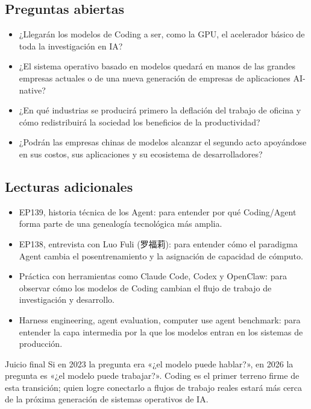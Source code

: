 \documentclass[a4paper]{article}
\begin{document}
\subsection{Preguntas abiertas}

\begin{itemize}
\item ¿Llegarán los modelos de Coding a ser, como la GPU, el acelerador básico de toda la investigación en IA?
\item ¿El sistema operativo basado en modelos quedará en manos de las grandes empresas actuales o de una nueva generación de empresas de aplicaciones AI-native?
\item ¿En qué industrias se producirá primero la deflación del trabajo de oficina y cómo redistribuirá la sociedad los beneficios de la productividad?
\item ¿Podrán las empresas chinas de modelos alcanzar el segundo acto apoyándose en sus costos, sus aplicaciones y su ecosistema de desarrolladores?
\end{itemize}

\subsection{Lecturas adicionales}

\begin{itemize}
\item EP139, historia técnica de los Agent: para entender por qué Coding/Agent forma parte de una genealogía tecnológica más amplia.
\item EP138, entrevista con Luo Fuli (罗福莉): para entender cómo el paradigma Agent cambia el posentrenamiento y la asignación de capacidad de cómputo.
\item Práctica con herramientas como Claude Code, Codex y OpenClaw: para observar cómo los modelos de Coding cambian el flujo de trabajo de investigación y desarrollo.
\item Harness engineering, agent evaluation, computer use agent benchmark: para entender la capa intermedia por la que los modelos entran en los sistemas de producción.
\end{itemize}

\begin{importantbox}{Juicio final}
Si en 2023 la pregunta era «¿el modelo puede hablar?», en 2026 la pregunta es «¿el modelo puede trabajar?». Coding es el primer terreno firme de esta transición; quien logre conectarlo a flujos de trabajo reales estará más cerca de la próxima generación de sistemas operativos de IA.
\end{importantbox}
\end{document}
